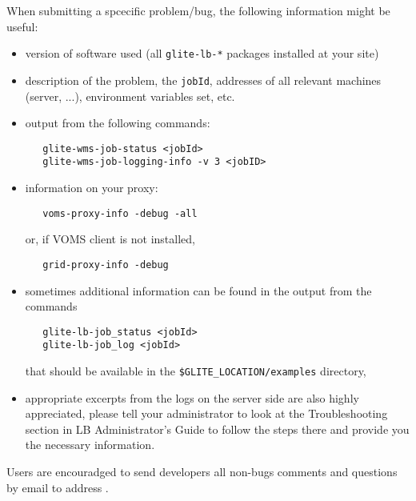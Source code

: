 When submitting a \LB spcecific problem/bug, the following information might be useful:
\begin{itemize}
\item version of software used (all \verb'glite-lb-*' packages installed at your site)
\item description of the problem, the \verb'jobId', addresses of all relevant
 machines (\LB server, ...), environment variables set, etc.
\item output from the following commands:
\begin{verbatim}
   glite-wms-job-status <jobId>
   glite-wms-job-logging-info -v 3 <jobID>
\end{verbatim}
\item information on your proxy:
\begin{verbatim}
   voms-proxy-info -debug -all
\end{verbatim}
or, if VOMS client is not installed, 
\begin{verbatim}
   grid-proxy-info -debug 
\end{verbatim}
\item sometimes additional information can be found in the output from the commands
\begin{verbatim}
   glite-lb-job_status <jobId>
   glite-lb-job_log <jobId>
\end{verbatim}
that should be available in the \verb'$GLITE_LOCATION/examples' directory,
\item appropriate excerpts from the logs on the server side are also highly appreciated, 
please tell your administrator to look at the Troubleshooting section in LB Administrator's 
Guide \cite{lbag} to follow the steps there and provide you the necessary information.
\end{itemize}

Users are encouradged to send developers all non-bugs comments and questions by email to
address .

